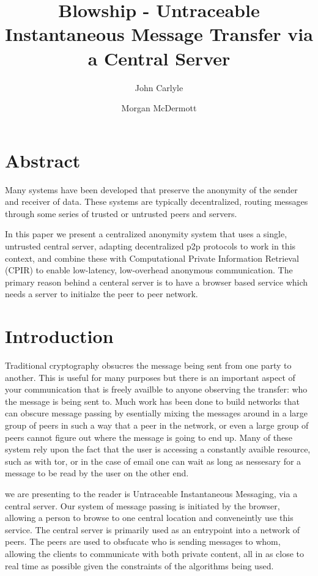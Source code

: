 \documentclass[twocolumn]{paper}
\title{Blowship - Untraceable Instantaneous Message Transfer via a Central Server}
\author[*]{John Carlyle}
\author[**]{Morgan McDermott}
\affil[*]{University of angry bees}
\affil[**]{University of flightless dragons}
\begin{document}
\maketitle

\section*{Abstract} 
Many systems have been developed that preserve the anonymity of the sender and receiver of data. These systems are typically decentralized, routing messages through some series of trusted or untrusted peers and servers. 

In this paper we present a centralized anonymity system that uses a single, untrusted central server, adapting decentralized p2p protocols to work in this context, and combine these with Computational Private Information Retrieval (CPIR) to enable low-latency, low-overhead anonymous communication. The primary reason behind a centeral server is to have a browser based service which needs a server to initialze the peer to peer network.

\section{Introduction}

Traditional cryptography obsucres the message being sent from one party to another. This is useful for many purposes but there is an important aspect of your communication that is freely availble to anyone observing the transfer: who the message is being sent to. Much work has been done to build networks that can obscure message passing by esentially mixing the messages around in a large group of peers in such a way that a peer in the network, or even a large group of peers cannot figure out where the message is going to end up. Many of these system rely upon the fact that the user is accessing a constantly avaible resource, such as with tor\cite{tor}, or in the case of email one can wait as long as nessesary for a message to be read by the user on the other end.

we are presenting to the reader is Untraceable Instantaneous Messaging, via a central server. Our system of message passing is initiated by the browser, allowing a person to browse to one central location and conveneintly use this service. The central server is primarily used as an entrypoint into a network of peers. The peers are used to obsfucate who is sending messages to whom, allowing the clients to communicate with both private content, all in as close to real time as possible given the constraints of the algorithms being used.
\end{document}
